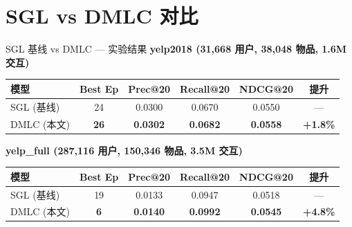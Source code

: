 \documentclass[9pt, aspectratio=169]{ctexbeamer}
\begin{document}
\section{SGL vs DMLC 对比}
\begin{frame}{SGL 基线 vs DMLC --- 实验结果}
  \centering
  \textbf{yelp2018 (31,668 用户, 38,048 物品, 1.6M 交互)}
  \begin{table}\centering\footnotesize
    \begin{tabular}{lccccc}
      \toprule
      模型 & Best Ep & Prec@20 & Recall@20 & NDCG@20 & 提升 \\
      \midrule
      SGL (基线) & 24 & 0.0300 & 0.0670 & 0.0550 & --- \\
      \rowcolor{green!20}
      DMLC (本文) & \textbf{26} & \textbf{0.0302} & \textbf{0.0682} & \textbf{0.0558} & \textbf{+1.8\%} \\
      \bottomrule
    \end{tabular}
  \end{table}

  \vspace{0.5em}
  \textbf{yelp\_full (287,116 用户, 150,346 物品, 3.5M 交互)}
  \begin{table}\centering\footnotesize
    \begin{tabular}{lccccc}
      \toprule
      模型 & Best Ep & Prec@20 & Recall@20 & NDCG@20 & 提升 \\
      \midrule
      SGL (基线) & 19 & 0.0133 & 0.0947 & 0.0518 & --- \\
      \rowcolor{green!20}
      DMLC (本文) & \textbf{6} & \textbf{0.0140} & \textbf{0.0992} & \textbf{0.0545} & \textbf{+4.8\%} \\
      \bottomrule
    \end{tabular}
  \end{table}
\end{frame}
\end{document}
